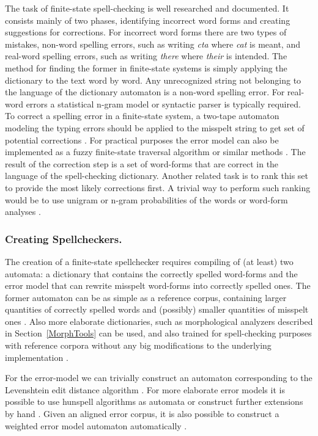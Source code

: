\documentclass[draft]{llncs}
\begin{document}
The task of finite-state spell-checking is well researched and documented. It
consists mainly of two phases, identifying incorrect word forms and creating
suggestions for corrections. For incorrect word forms there are two types of
mistakes, non-word spelling errors, such as writing \emph{cta} where \emph{cat}
is meant, and real-word spelling errors, such as writing \emph{there} where
\emph{their} is intended. The method for finding the former in finite-state systems
is simply applying the dictionary to the text word by word. Any unrecognized
string not belonging to the language of the dictionary automaton is a non-word
spelling error. For real-word errors a statistical n-gram model or syntactic
parser is typically required. To correct a spelling error in a finite-state
system, a two-tape automaton modeling the typing errors should be applied to
the misspelt string to get set of potential corrections \cite{pirinen/2010/lrec}.
For practical purposes the error model can also be implemented as a
fuzzy finite-state traversal algorithm or similar methods \cite{oflazer/1996}. The result
of the correction step is a set of word-forms that are correct in the
language of the spell-checking dictionary. Another related task is to rank this
set to provide the most likely corrections first.
A trivial way to perform such ranking would be to use
unigram \cite{pirinen/2010/lrec} or n-gram probabilities of the words 
\cite{mays/1991} or word-form analyses \cite{pirinen/2012/cicling}.

\subsubsection{Creating Spellcheckers.}

The creation of a finite-state spellchecker requires compiling of (at least) two
automata: a dictionary that contains the correctly spelled word-forms and the
error model that can rewrite misspelt word-forms into correctly spelled ones.
The former automaton can be as simple as a reference corpus, containing larger
quantities of correctly spelled words and (possibly) smaller quantities of
misspelt ones \cite{norvig/2010}. Also more elaborate dictionaries, such as
morphological analyzers described in Section~\ref{MorphTools} can be used, and also
trained for spell-checking purposes with reference corpora without any big
modifications to the underlying implementation \cite{pirinen/2010/lrec}.

For the error-model we can trivially construct an automaton corresponding to
the Levenshtein edit distance algorithm \cite{oflazer/1996,agata/2002}. For more elaborate error models
it is possible to use hunspell algorithms as automata \cite{pirinen/2010/il} or
construct further extensions by hand \cite{pirinen/2010/lrec}. Given an
aligned error corpus, it is also possible to construct a weighted error model
automaton automatically \cite{brill/2000}.
\end{document}
